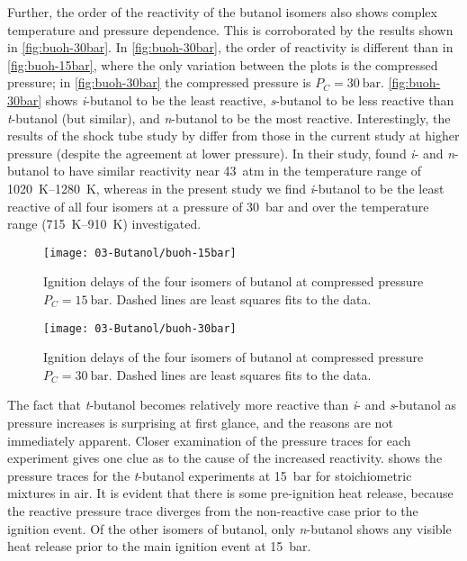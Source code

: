 \documentclass[12pt, letterpaper]{article}
\begin{document}
Further, the order of the reactivity of the butanol isomers also shows complex
temperature and pressure dependence. This is corroborated by the results shown
in \autoref{fig:buoh-30bar}. In \autoref{fig:buoh-30bar}, the order of
reactivity is different than in \autoref{fig:buoh-15bar}, where the only
variation between the plots is the compressed pressure; in
\autoref{fig:buoh-30bar} the compressed pressure is $P_C=\SI{30}{\bar}$.
\autoref{fig:buoh-30bar} shows \textit{i}-butanol to be the least reactive,
\textit{s}-butanol to be less reactive than \textit{t}-butanol (but similar),
and \textit{n}-butanol to be the most reactive. Interestingly, the results of
the shock tube study by \textcite{Stranic2012} differ from those in the current
study at higher pressure (despite the agreement at lower pressure). In their
study, \textcite{Stranic2012} found \textit{i}- and \textit{n}-butanol to have
similar reactivity near \SI{43}{atm} in the temperature range of \SIrange{1020}{1280}{\kelvin},
whereas in the present study we find \textit{i}-butanol to be the least
reactive of all four isomers at a pressure of \SI{30}{\bar} and over the temperature
range (\SIrange{715}{910}{\kelvin}) investigated.

\begin{figure}
    \begin{floatrow}
    \ffigbox
        {\texttt{[image: 03-Butanol/buoh-15bar]}}
        {\caption{Ignition delays of the four isomers of butanol at compressed
            pressure $P_C=\SI{15}{\bar}$. Dashed lines are least squares fits to the
            data.}
        \label{fig:buoh-15bar}}
    \ffigbox
        {\texttt{[image: 03-Butanol/buoh-30bar]}}
        {\caption{Ignition delays of the four isomers of butanol at compressed
            pressure $P_C=\SI{30}{\bar}$. Dashed lines are least squares fits to the
            data.}
        \label{fig:buoh-30bar}}
    \end{floatrow}
\end{figure}

The fact that \textit{t}-butanol becomes relatively more reactive than
\textit{i}- and \textit{s}-butanol as pressure increases is surprising at first
glance, and the reasons are not immediately apparent. Closer examination of the
pressure traces for each experiment gives one clue as to the cause of the
increased reactivity.  shows the pressure traces for
the \textit{t}-butanol experiments at \SI{15}{\bar} for stoichiometric mixtures in
air. It is evident that there is some pre-ignition heat release, because the
reactive pressure trace diverges from the non-reactive case prior to the
ignition event. Of the other isomers of butanol, only \textit{n}-butanol shows
any visible heat release prior to the main ignition event at \SI{15}{\bar}.
\end{document}
